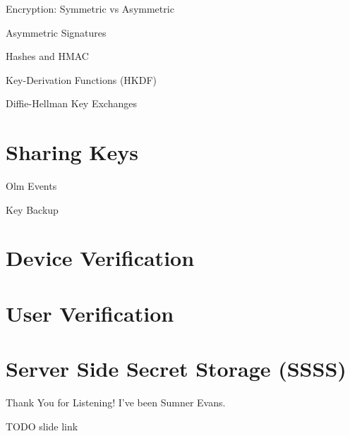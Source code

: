 \documentclass{beeper}
\begin{document}
\begin{frame}{Encryption: Symmetric vs Asymmetric}
\end{frame}

\begin{frame}{Asymmetric Signatures}
\end{frame}

\begin{frame}{Hashes and HMAC}
\end{frame}

\begin{frame}{Key-Derivation Functions (HKDF)}
\end{frame}

\begin{frame}{Diffie-Hellman Key Exchanges}
\end{frame}

\section{Sharing Keys}

\begin{frame}{Olm Events}
\end{frame}

\begin{frame}{Key Backup}
\end{frame}

\section{Device Verification}

\section{User Verification}

\section{Server Side Secret Storage (SSSS)}

\begin{frame}{Thank You for Listening!}
    I've been Sumner Evans.

    TODO slide link
\end{frame}
\end{document}
